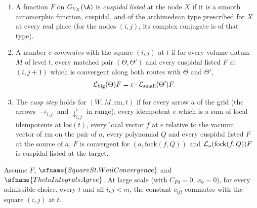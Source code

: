 \begin{definition}\label{def:pf:rowprops:commutes}
\begin{enumerate}[label=(\alph*)]
\item A function $F$ on $G_{V_X}(\A)$ is \emph{cuspidal listed} at the node $X$ if it is a smooth automorphic function,
cuspidal, and of the archimedean type prescribed for $X$ at every real place (for the nodes $(i,j)$, its complex
conjugate is of that type).
\item A number $c$ \emph{commutes} with the square $(i,j)$ at $t$ if for every volume datum $M$ of level $t$, every matched
pair $(\Theta,\Theta')$ and every cuspidal listed $F$ at $(i,j+1)$ which is convergent along both routes with $\Theta$
and $\Theta'$,
\begin{equation}\label{eq:pf:rowprops:commute}
\mathcal{L}_{\mathrm{big}}(\Theta)F=c\cdot\mathcal{L}_{\mathrm{small}}(\Theta')F .
\end{equation}
\item The \emph{cusp step} holds for $(W,M,\mathrm{rm},t)$ if for every arrow $a$ of the grid (the arrows
$\rightarrow_{i,j}$ and $\downarrow^t_{i,j}$ in range), every idempotent $e$ which is a sum of local idempotents at
$\mathrm{loc}(t)$, every local vector $f$ at $e$ relative to the vacuum vector of $\mathrm{rm}$ on the pair of $a$, every
polynomial $Q$ and every cuspidal listed $F$ at the source of $a$, $F$ is convergent for $(a,\mathrm{fock}(f,Q))$ and
$\mathcal{L}_a(\mathrm{fock}(f,Q))F$ is cuspidal listed at the target.
\end{enumerate}
\end{definition}

\begin{lemma}\label{pf:rowprops:commute}
Assume $F$, $\sfname{SquareSt.WeilConvergence}$ and $\sfname{ThetaIntegralsAgree}$. At large scale (with $C_{F0}=0$,
$x_0=0$), for every admissible choice, every $t$ and all $i,j<m$, the constant $c_{ijt}$ commutes with the square $(i,j)$
at $t$.
\end{lemma}

